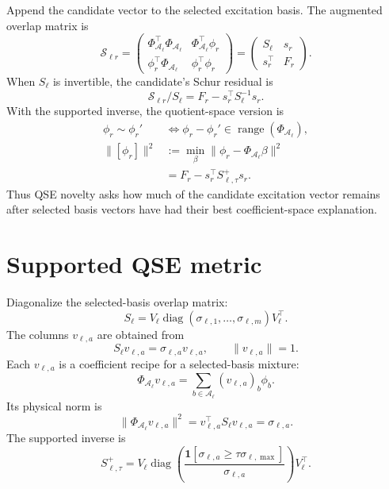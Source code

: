 \documentclass[10pt,twocolumn]{article}
\newcommand{\range}{\operatorname{range}}
\newcommand{\diag}{\operatorname{diag}}
\begin{document}
Append the candidate vector to the selected excitation basis. The augmented overlap matrix is
\begin{equation}
\mathcal S_{\ell r}
=
\begin{pmatrix}
\Phi_{\mathcal A_\ell}^\top\Phi_{\mathcal A_\ell}
&\Phi_{\mathcal A_\ell}^\top\phi_r\\
\phi_r^\top\Phi_{\mathcal A_\ell}
&\phi_r^\top\phi_r
\end{pmatrix}
=
\begin{pmatrix}
S_\ell&s_r\\
s_r^\top&F_r
\end{pmatrix}.
\label{eq:p3_augmented_overlap}
\end{equation}
When \(S_\ell\) is invertible, the candidate's Schur residual is
\begin{equation}
\mathcal S_{\ell r}/S_\ell
=F_r-s_r^\top S_\ell^{-1}s_r.
\label{eq:p3_schur_residual}
\end{equation}
With the supported inverse, the quotient-space version is
\begin{equation}
\begin{aligned}
\phi_r\sim\phi_r'
&\Longleftrightarrow
\phi_r-\phi_r'\in\range(\Phi_{\mathcal A_\ell}),\\
\|[\phi_r]\|^2
&:=\min_\beta\|\phi_r-\Phi_{\mathcal A_\ell}\beta\|^2\\
&=F_r-s_r^\top S_{\ell,\tau}^+s_r.
\end{aligned}
\label{eq:p3_quotient_residual}
\end{equation}
Thus QSE novelty asks how much of the candidate excitation vector remains after selected basis vectors have had their best coefficient-space explanation.

\section{Supported QSE metric}

Diagonalize the selected-basis overlap matrix:
\begin{equation}
S_\ell=V_\ell\diag(\sigma_{\ell,1},\ldots,\sigma_{\ell,m})V_\ell^\top.
\label{eq:p3_eigs}
\end{equation}
The columns \(v_{\ell,a}\) are obtained from
\begin{equation}
S_\ell v_{\ell,a}=\sigma_{\ell,a}v_{\ell,a},
\qquad \|v_{\ell,a}\|=1.
\label{eq:p3_eigenproblem}
\end{equation}
Each \(v_{\ell,a}\) is a coefficient recipe for a selected-basis mixture:
\begin{equation}
\Phi_{\mathcal A_\ell}v_{\ell,a}=\sum_{b\in\mathcal A_\ell}(v_{\ell,a})_b\phi_b.
\label{eq:p3_mode_synthesis}
\end{equation}
Its physical norm is
\begin{equation}
\|\Phi_{\mathcal A_\ell}v_{\ell,a}\|^2
=v_{\ell,a}^\top S_\ell v_{\ell,a}=\sigma_{\ell,a}.
\label{eq:p3_mode_length}
\end{equation}
The supported inverse is
\begin{equation}
S_{\ell,\tau}^+
=V_\ell\diag\left(\frac{\mathbf 1[\sigma_{\ell,a}\ge\tau\sigma_{\ell,\max}]}{\sigma_{\ell,a}}\right)V_\ell^\top.
\label{eq:p3_supported_inverse}
\end{equation}
\end{document}

